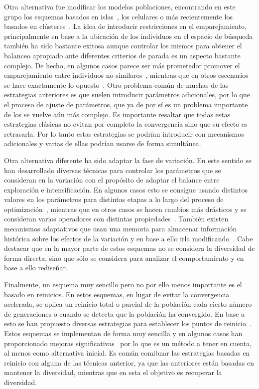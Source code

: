 Otra alternativa fue modificar los modelos poblaciones, encontrando en este grupo los esquemas basados en islas~\cite{alba2005parallel}, los celulares
o más recientemente los basados en clústeres~\cite{gao2014cluster}.
%
La idea de introducir restricciones en el emparejamiento, principalmente en base a la ubicación de los individuos en el espacio de búsqueda también
ha sido bastante exitosa aunque controlar los mismos para obtener el balanceo apropiado ante diferentes criterios de parada
es un aspecto bastante complejo.
%
De hecho, en algunos casos parece ser más prometedor promover el emparejamiento entre individuos no similares~\cite{Joel:CHC}, mientras que en otros escenarios 
se hace exactamente lo opuesto~\cite{deb1989investigation}.
%
Otro problema común de muchas de las estrategias anteriores es que suelen introducir parámetros adicionales, por lo que el proceso de ajuste de parámetros, que ya de por sí
es un problema importante de los \EAS{} se vuelve aún más complejo.
%
Es importante resaltar que todas estas estrategias clásicas no evitan por completo la convergencia sino que su efecto es retrasarla.
%
Por lo tanto estas estrategias se podrían introducir con mecanismos adicionales y varias de ellas podrían usarse de forma simultánea.

Otra alternativa diferente ha sido adaptar la fase de variación.
%
En este sentido se han desarrollado diversas técnicas para controlar los parámetros que se consideran en la variación con el propósito de 
adaptar el balance entre exploración e intensificación.
%
En algunos casos esto se consigue usando distintos valores en los parámetros para distintas etapas a lo largo del proceso de optimización~\cite{yu2014differential},
mientras que en otros casos se hacen cambios más drásticos y se consideran varios operadores con distintas propiedades~\cite{lobo2007parameter}.
%
También existen mecanismos adaptativos que usan una memoria para almacenar información histórica sobre los efectos de la variación
y en base a ello irla modificando~\cite{yuen2009genetic}.
%
Cabe destacar que en la mayor parte de estos esquemas no se considera la diversidad de forma directa, sino que sólo se considera para analizar el comportamiento
y en base a ello rediseñar.

Finalmente, un esquema muy sencillo pero no por ello menos importante es el basado en reinicios.
%
En estos esquemas, en lugar de evitar la convergencia acelerada, se aplica un reinicio total o parcial de la población cada cierto número de
generaciones o cuando se detecta que la población ha convergido.
%
En base a esto se han propuesto diversas estrategias para establecer los puntos de reinicio~\cite{jansen2002analysis}.
%
Estos esquemas se implementan de forma muy sencilla y en algunos casos han proporcionado mejoras significativas~\cite{koumousis2006saw} por lo que
es un método a tener en cuenta, al menos como alternativa inicial.
%
Es común comibnar las estrategias basadas en reinicio con alguna de las técnicas anterior, ya que las anteriores están basadas en mantener
la diversidad, mientras que en esta el objetivo es recuperar la diversidad.

